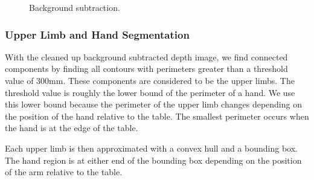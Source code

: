 \begin{figure}[h]
  \centering
  \caption{Background subtraction.} \label{fig:background}
\end{figure}


\subsubsection{Upper Limb and Hand Segmentation}
With the cleaned up background subtracted depth image, we find connected
components by finding all contours with perimeters greater than a
threshold value of 300mm. These components are considered to be the upper limbs. 
The threshold value is roughly the lower bound of the perimeter
of a hand. We use this lower bound because the perimeter of the
upper limb changes depending on the position of the hand relative to the table.
The smallest perimeter occurs when the hand is at the edge of the table.

Each upper limb is then approximated with a convex hull and a bounding box. The
hand region is at either end of the bounding box depending on the position of 
the arm relative to the table.


